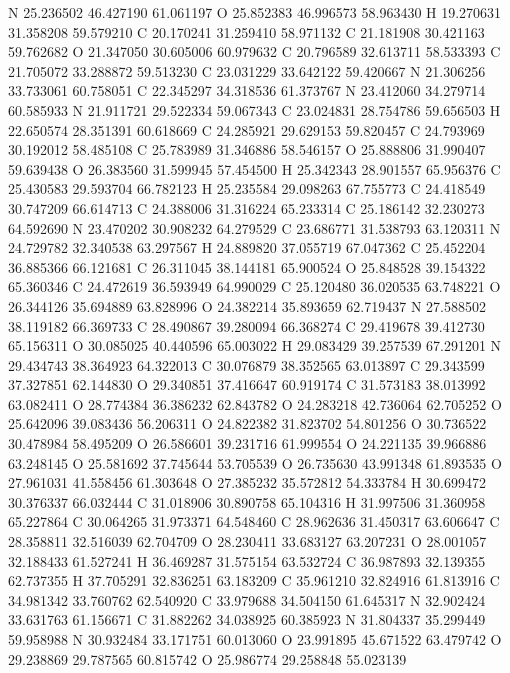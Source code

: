 \documentclass{article}
\begin{document}
N 25.236502 46.427190 61.061197 
O 25.852383 46.996573 58.963430 
H 19.270631 31.358208 59.579210 
C 20.170241 31.259410 58.971132 
C 21.181908 30.421163 59.762682 
O 21.347050 30.605006 60.979632 
C 20.796589 32.613711 58.533393 
C 21.705072 33.288872 59.513230 
C 23.031229 33.642122 59.420667 
N 21.306256 33.733061 60.758051 
C 22.345297 34.318536 61.373767 
N 23.412060 34.279714 60.585933 
N 21.911721 29.522334 59.067343 
C 23.024831 28.754786 59.656503 
H 22.650574 28.351391 60.618669 
C 24.285921 29.629153 59.820457 
C 24.793969 30.192012 58.485108 
C 25.783989 31.346886 58.546157 
O 25.888806 31.990407 59.639438 
O 26.383560 31.599945 57.454500 
H 25.342343 28.901557 65.956376 
C 25.430583 29.593704 66.782123 
H 25.235584 29.098263 67.755773 
C 24.418549 30.747209 66.614713 
C 24.388006 31.316224 65.233314 
C 25.186142 32.230273 64.592690 
N 23.470202 30.908232 64.279529 
C 23.686771 31.538793 63.120311 
N 24.729782 32.340538 63.297567 
H 24.889820 37.055719 67.047362 
C 25.452204 36.885366 66.121681 
C 26.311045 38.144181 65.900524 
O 25.848528 39.154322 65.360346 
C 24.472619 36.593949 64.990029 
C 25.120480 36.020535 63.748221 
O 26.344126 35.694889 63.828996 
O 24.382214 35.893659 62.719437 
N 27.588502 38.119182 66.369733 
C 28.490867 39.280094 66.368274 
C 29.419678 39.412730 65.156311 
O 30.085025 40.440596 65.003022 
H 29.083429 39.257539 67.291201 
N 29.434743 38.364923 64.322013 
C 30.076879 38.352565 63.013897 
C 29.343599 37.327851 62.144830 
O 29.340851 37.416647 60.919174 
C 31.573183 38.013992 63.082411 
O 28.774384 36.386232 62.843782 
O 24.283218 42.736064 62.705252 
O 25.642096 39.083436 56.206311 
O 24.822382 31.823702 54.801256 
O 30.736522 30.478984 58.495209 
O 26.586601 39.231716 61.999554 
O 24.221135 39.966886 63.248145 
O 25.581692 37.745644 53.705539 
O 26.735630 43.991348 61.893535 
O 27.961031 41.558456 61.303648 
O 27.385232 35.572812 54.333784 
H 30.699472 30.376337 66.032444 
C 31.018906 30.890758 65.104316 
H 31.997506 31.360958 65.227864 
C 30.064265 31.973371 64.548460 
C 28.962636 31.450317 63.606647 
C 28.358811 32.516039 62.704709 
O 28.230411 33.683127 63.207231 
O 28.001057 32.188433 61.527241 
H 36.469287 31.575154 63.532724 
C 36.987893 32.139355 62.737355 
H 37.705291 32.836251 63.183209 
C 35.961210 32.824916 61.813916 
C 34.981342 33.760762 62.540920 
C 33.979688 34.504150 61.645317 
N 32.902424 33.631763 61.156671 
C 31.882262 34.038925 60.385923 
N 31.804337 35.299449 59.958988 
N 30.932484 33.171751 60.013060 
O 23.991895 45.671522 63.479742 
O 29.238869 29.787565 60.815742 
O 25.986774 29.258848 55.023139 
\end{document}
